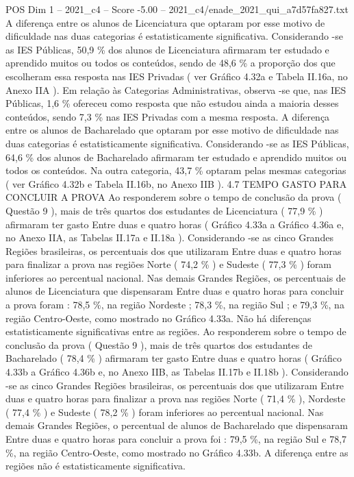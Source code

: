 \begin{textsample}{POS Dim 1 – 2021\_c4 – Score -5.00 – 2021\_c4/enade\_2021\_qui\_a7d57fa827.txt}
A diferença entre os alunos de Licenciatura que optaram por esse motivo de dificuldade nas duas categorias é estatisticamente significativa.
Considerando -se as IES Públicas, 50,9 \% dos alunos de Licenciatura afirmaram ter estudado e aprendido muitos ou todos os conteúdos, sendo de 48,6 \% a proporção dos que escolheram essa resposta nas IES Privadas ( ver Gráfico 4.32a e Tabela II.16a, no Anexo IIA ).
Em relação às Categorias Administrativas, observa -se que, nas IES Públicas, 1,6 \% ofereceu como resposta que não estudou ainda a maioria desses conteúdos, sendo 7,3 \% nas IES Privadas com a mesma resposta.
A diferença entre os alunos de Bacharelado que optaram por esse motivo de dificuldade nas duas categorias é estatisticamente significativa.
Considerando -se as IES Públicas, 64,6 \% dos alunos de Bacharelado afirmaram ter estudado e aprendido muitos ou todos os conteúdos.
Na outra categoria, 43,7 \% optaram pelas mesmas categorias ( ver Gráfico 4.32b e Tabela II.16b, no Anexo IIB ). 4.7 TEMPO GASTO PARA CONCLUIR A PROVA Ao responderem sobre o tempo de conclusão da prova ( Questão 9 ), mais de três quartos dos estudantes de Licenciatura ( 77,9 \% ) afirmaram ter gasto Entre duas e quatro horas ( Gráfico 4.33a a Gráfico 4.36a e, no Anexo IIA, as Tabelas II.17a e II.18a ).
Considerando -se as cinco Grandes Regiões brasileiras, os percentuais dos que utilizaram Entre duas e quatro horas para finalizar a prova nas regiões Norte ( 74,2 \% ) e Sudeste ( 77,3 \% ) foram inferiores ao percentual nacional.
Nas demais Grandes Regiões, os percentuais de alunos de Licenciatura que dispensaram Entre duas e quatro horas para concluir a prova foram : 78,5 \%, na região Nordeste ; 78,3 \%, na região Sul ; e 79,3 \%, na região Centro-Oeste, como mostrado no Gráfico 4.33a.
Não há diferenças estatisticamente significativas entre as regiões.
Ao responderem sobre o tempo de conclusão da prova ( Questão 9 ), mais de três quartos dos estudantes de Bacharelado ( 78,4 \% ) afirmaram ter gasto Entre duas e quatro horas ( Gráfico 4.33b a Gráfico 4.36b e, no Anexo IIB, as Tabelas II.17b e II.18b ).
Considerando -se as cinco Grandes Regiões brasileiras, os percentuais dos que utilizaram Entre duas e quatro horas para finalizar a prova nas regiões Norte ( 71,4 \% ), Nordeste ( 77,4 \% ) e Sudeste ( 78,2 \% ) foram inferiores ao percentual nacional.
Nas demais Grandes Regiões, o percentual de alunos de Bacharelado que dispensaram Entre duas e quatro horas para concluir a prova foi : 79,5 \%, na região Sul e 78,7 \%, na região Centro-Oeste, como mostrado no Gráfico 4.33b.
A diferença entre as regiões não é estatisticamente significativa.

\end{textsample}
